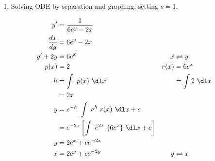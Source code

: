 \begin{enumerate}
    \item Solving ODE by separation and graphing, setting $ c = 1 $,

          \begin{align}
              y'            & = \frac{1}{6e^{y} - 2x}                                                                    \\
              \frac{dx}{dy} & = 6e^{y} - 2x                                                                              \\
              y' + 2y       & = 6e^{x}                                                     & x    & \rightleftharpoons y \\
              p(x)          & = 2                                                          & r(x) & = 6e^{x}             \\
              h             & = \int\ p(x)\ \dl x                                          &      & = \int 2\ \dl x      \\
                            & = 2x                                                                                       \\
              y             & = e^{-h}\ \int\ e^{h}\ r(x)\ \dl x + c                                                     \\
                            & = e^{-2x} \left[ \int\ e^{2x}\ \{6e^{x}\}\ \dl x + c \right]                               \\
              y             & =  2e^{x} + ce^{-2x}                                                                       \\
              x             & = 2e^{y} + ce^{-2y}                                          & y    & \rightleftharpoons x
          \end{align}


\end{enumerate}

